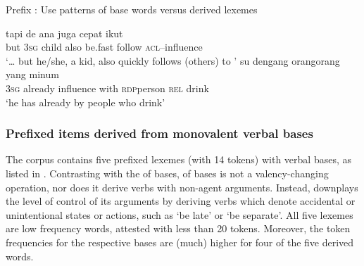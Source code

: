 \newpage
\begin{styleExampleTitle}
{Prefix : Use patterns of base words versus derived lexemes}
\end{styleExampleTitle}
\ea
\label{Example_3.5}
\gll {\ldots} {tapi} {de} {ana} {juga} {cepat} {ikut} {}\\ %
 { }    but  \textsc{3sg}  child  also  be.fast  follow  \textsc{acl}–influence\\
\glt 
‘{\ldots} but he/she, a kid, also quickly follows (others) to ’ \textstyleExampleSource{[080917-010-CvEx.0001]}
\z
\ea
\label{Example_3.6}
 {su} {} {dengang} {orang{\Tilde}orang} {yang} {minum}\\ %
 \textsc{3sg}  already  influence  with  \textsc{rdp}{\Tilde}person  \textsc{rel}  drink\\
\glt
‘he has already  by people who drink’ \textstyleExampleSource{[080919-007-CvNP.0018]}
\z


\subsubsection[Prefixed items derived from {monovalent} verbal bases]{Prefixed items derived from {monovalent} verbal bases}\label{Para_3.1.2.3}
The corpus contains five prefixed lexemes (with 14 tokens) with  verbal bases, as listed in . Contrasting with the  of  bases,  of  bases is not a valency-changing operation, nor does it derive verbs with non-agent arguments. Instead,  downplays the level of control of its arguments by deriving  verbs which denote accidental or unintentional states or actions, such as  ‘be late’ or  ‘be separate’. All five lexemes are low frequency words, attested with less than 20 tokens. Moreover, the token frequencies for the respective bases are (much) higher for four of the five derived words.

